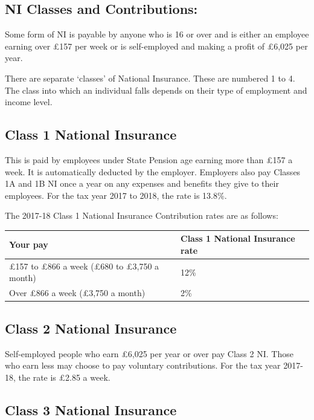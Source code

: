 \documentclass[]{tufte-handout}
\begin{document}
\hypertarget{ni-classes-and-contributions}{%
\subsection{NI Classes and
Contributions:}\label{ni-classes-and-contributions}}

Some form of NI is payable by anyone who is 16 or over and is either an
employee earning over £157 per week or is self-employed and making a
profit of £6,025 per year.

There are separate `classes' of National Insurance. These are numbered 1
to 4. The class into which an individual falls depends on their type of
employment and income level.

\hypertarget{class-1-national-insurance}{%
\subsection{Class 1 National
Insurance}\label{class-1-national-insurance}}

This is paid by employees under State Pension age earning more than £157
a week. It is automatically deducted by the employer. Employers also pay
Classes 1A and 1B NI once a year on any expenses and benefits they give
to their employees. For the tax year 2017 to 2018, the rate is 13.8\%.

The 2017-18 Class 1 National Insurance Contribution rates are as
follows:

\begin{longtable}[]{@{}ll@{}}
\toprule
Your pay & Class 1 National Insurance rate\tabularnewline
\midrule
\endhead
£157 to £866 a week (£680 to £3,750 a month) & 12\%\tabularnewline
Over £866 a week (£3,750 a month) & 2\%\tabularnewline
\bottomrule
\end{longtable}

\hypertarget{class-2-national-insurance}{%
\subsection{Class 2 National
Insurance}\label{class-2-national-insurance}}

Self-employed people who earn £6,025 per year or over pay Class 2 NI.
Those who earn less may choose to pay voluntary contributions. For the
tax year 2017-18, the rate is £2.85 a week.

\hypertarget{class-3-national-insurance}{%
\subsection{Class 3 National
Insurance}\label{class-3-national-insurance}}
\end{document}
